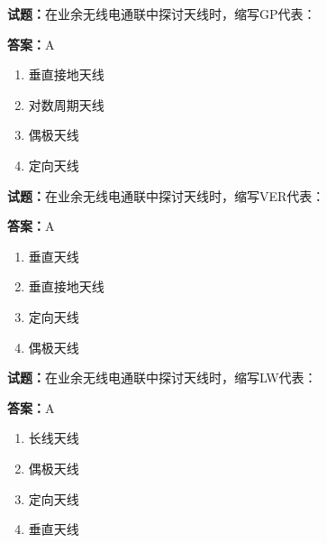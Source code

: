 \documentclass{ctexbook}
\begin{document}




\vspace{1em}

\textbf{试题：}在业余无线电通联中探讨天线时，缩写GP代表： 

\textbf{答案：}A 

\begin{enumerate}[leftmargin=3em]
  \item 垂直接地天线 

  \item 对数周期天线 

  \item 偶极天线 

  \item 定向天线 

\end{enumerate}





\vspace{1em}

\textbf{试题：}在业余无线电通联中探讨天线时，缩写VER代表： 

\textbf{答案：}A 

\begin{enumerate}[leftmargin=3em]
  \item 垂直天线 

  \item 垂直接地天线 

  \item 定向天线 

  \item 偶极天线 

\end{enumerate}






\vspace{1em}

\textbf{试题：}在业余无线电通联中探讨天线时，缩写LW代表： 

\textbf{答案：}A 

\begin{enumerate}[leftmargin=3em]
  \item 长线天线 

  \item 偶极天线 

  \item 定向天线 

  \item 垂直天线 

\end{enumerate}
\end{document}
